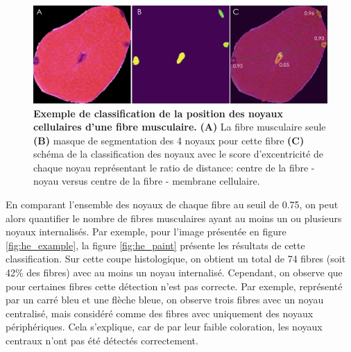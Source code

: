 \begin{figure}[htbp]
 \centering
 \includegraphics[width=1\textwidth]{figures/he_single_nuc.png}
 \caption[Exemple de classification de la position des noyaux]{\textbf{Exemple de classification de la position des noyaux cellulaires d'une fibre musculaire.} \textbf{(A)} La fibre musculaire seule \textbf{(B)} masque de segmentation des 4 noyaux pour cette fibre \textbf{(C)} schéma de la classification des noyaux avec le score d'excentricité de chaque noyau représentant le ratio de distance: centre de la fibre - noyau versus centre de la fibre - membrane cellulaire.}
 \label{fig:he_single_nuc}
\end{figure}

En comparant l'ensemble des noyaux de chaque fibre au seuil de 0.75, on peut alors quantifier le nombre de fibres musculaires ayant au moins un ou plusieurs noyaux internalisés. Par exemple, pour l'image présentée en figure \ref{fig:he_example}, la figure \ref{fig:he_paint} présente les résultats de cette classification. Sur cette coupe histologique, on obtient un total de 74 fibres (soit 42\% des fibres) avec au moins un noyau internalisé. Cependant, on observe que pour certaines fibres cette détection n'est pas correcte. Par exemple, représenté par un carré bleu et une flèche bleue, on observe trois fibres avec un noyau centralisé, mais considéré comme des fibres avec uniquement des noyaux périphériques. Cela s'explique, car de par leur faible coloration, les noyaux centraux n'ont pas été détectés correctement.

